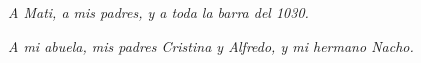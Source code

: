 \chapter*{}
\begin{flushright}
  \textit{A Mati, a mis padres, y a toda la barra del 1030.}

  \textit{A mi abuela, mis padres Cristina y Alfredo, y mi hermano Nacho.}
\end{flushright}
\newpage
